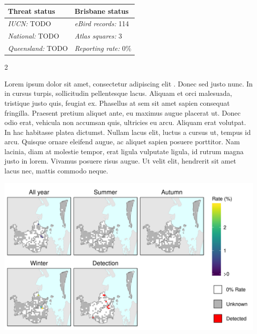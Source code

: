 \documentclass[12pt,openany,oneside]{book}
\let\origfigure\figure
\let\endorigfigure\endfigure
\renewenvironment{figure}[1][2] {
  \expandafter\origfigure\expandafter[H]
} {
  \endorigfigure
}
\let\Begin\begin
\let\End\end
\theoremstyle{definition}
\theoremstyle{definition}
\theoremstyle{definition}
\theoremstyle{remark}
\begin{document}
\begin{tabu} to 
\toprule
Threat status & Brisbane status\\
\midrule
\textit{IUCN:} TODO & \textit{eBird records:} 114\\
\textit{National:} TODO & \textit{Atlas squares:} 3\\
\textit{Queensland:} TODO & \textit{Reporting rate:} 0\%\\
\bottomrule
\end{tabu} 
\vspace{0.15cm}

\Begin{multicols}{2}

Lorem ipsum dolor sit amet, consectetur adipiscing elit
\citep{rexample1, rexample2, rexample3}. Donec sed justo nunc. In in
cursus turpis, sollicitudin pellentesque lacus. Aliquam et orci
malesuada, tristique justo quis, feugiat ex. Phasellus at sem sit amet
sapien consequat fringilla. Praesent pretium aliquet ante, eu maximus
augue placerat ut. Donec odio erat, vehicula non accumsan quis,
ultricies eu arcu. Aliquam erat volutpat. In hac habitasse platea
dictumst. Nullam lacus elit, luctus a cursus ut, tempus id arcu. Quisque
ornare eleifend augue, ac aliquet sapien posuere porttitor. Nam lacinia,
diam at molestie tempor, erat ligula vulputate ligula, id rutrum magna
justo in lorem. Vivamus posuere risus augue. Ut velit elit, hendrerit
sit amet lacus nec, mattis commodo neque.

\End{multicols}

\clearpage

\begin{figure}
\centering
\includegraphics[height=0.47\textheight,width=\textwidth,keepaspectratio=true]{assets/maps/Stictonetta-naevosa.png}
\end{figure}
\end{document}

